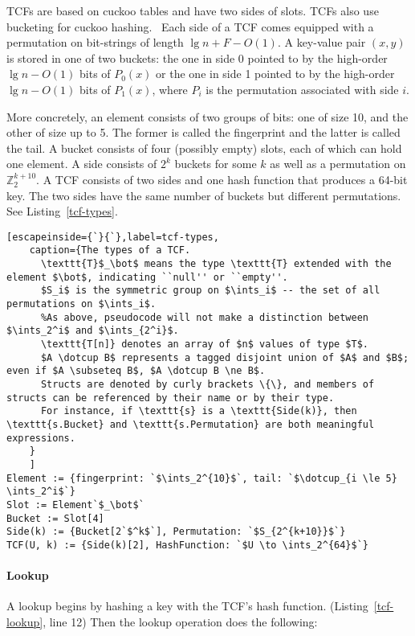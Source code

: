 \documentclass[letterpaper,twocolumn,10pt]{article}
\newcommand{\ints}{\mathbb{Z}}
\newcommand{\dotcup}{\ensuremath{\mathaccent\cdot\cup}}
\begin{document}
TCFs are based on cuckoo tables and have two sides of slots.
TCFs also use bucketing for cuckoo hashing.~\cite{buckets}
Each side of a TCF comes equipped with a permutation on bit-strings of length $\lg n + F - O(1)$.
A key-value pair $(x, y)$ is stored in one of two buckets: the one in side 0 pointed to by the high-order $\lg n - O(1)$ bits of $P_0(x)$ or the one in side 1 pointed to by the high-order $\lg n - O(1)$ bits of $P_1(x)$, where $P_i$ is the permutation associated with side $i$.

More concretely, an element consists of two groups of bits: one of size 10, and the other of size up to 5.
The former is called the fingerprint and the latter is called the tail.
A bucket consists of four (possibly empty) slots, each of which can hold one element.
A side consists of $2^k$ buckets for some $k$ as well as a permutation on $\ints_2^{k+10}$. %
A TCF consists of two sides and one hash function that produces a 64-bit key.
The two sides have the same number of buckets but different permutations.
See Listing~\ref{tcf-types}.

\begin{figure*}
\begin{lstlisting}[escapeinside={`}{`},label=tcf-types,
    caption={The types of a TCF.
      \texttt{T}$_\bot$ means the type \texttt{T} extended with the element $\bot$, indicating ``null'' or ``empty''.
      $S_i$ is the symmetric group on $\ints_i$ -- the set of all permutations on $\ints_i$.
      %As above, pseudocode will not make a distinction between $\ints_2^i$ and $\ints_{2^i}$.
      \texttt{T[n]} denotes an array of $n$ values of type $T$.
      $A \dotcup B$ represents a tagged disjoint union of $A$ and $B$; even if $A \subseteq B$, $A \dotcup B \ne B$.
      Structs are denoted by curly brackets \{\}, and members of structs can be referenced by their name or by their type.
      For instance, if \texttt{s} is a \texttt{Side(k)}, then \texttt{s.Bucket} and \texttt{s.Permutation} are both meaningful expressions.
    }
    ]
Element := {fingerprint: `$\ints_2^{10}$`, tail: `$\dotcup_{i \le 5} \ints_2^i$`}
Slot := Element`$_\bot$`
Bucket := Slot[4]
Side(k) := {Bucket[2`$^k$`], Permutation: `$S_{2^{k+10}}$`}
TCF(U, k) := {Side(k)[2], HashFunction: `$U \to \ints_2^{64}$`}
\end{lstlisting}
\end{figure*}

\paragraph{Lookup}
A lookup begins by hashing a key with the TCF's hash function. (Listing~\ref{tcf-lookup}, line 12)
Then the lookup operation does the following:
\end{document}
